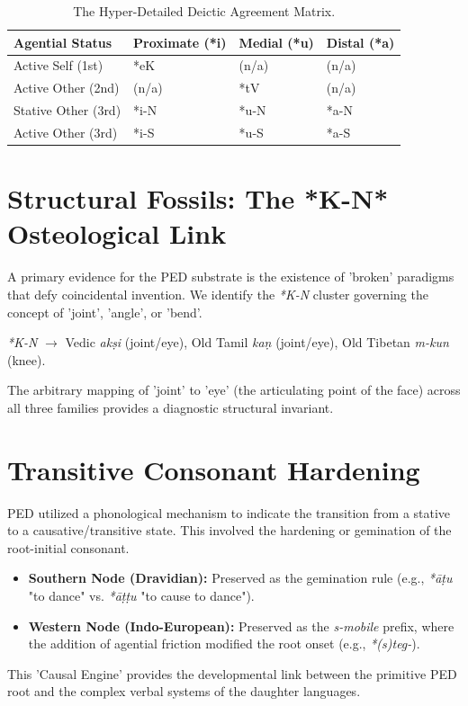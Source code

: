 \documentclass[11pt,oneside,openany]{book}
\begin{document}
\begin{table}[h]
\centering
\begin{tabular}{@{}llll@{}}
\toprule
\textbf{Agential Status} & \textbf{Proximate (*i)} & \textbf{Medial (*u)} & \textbf{Distal (*a)} \\ \midrule
Active Self (1st) & *eK & (n/a) & (n/a) \\
Active Other (2nd) & (n/a) & *tV & (n/a) \\
Stative Other (3rd) & *i-N & *u-N & *a-N \\
Active Other (3rd) & *i-S & *u-S & *a-S \\ \bottomrule
\end{tabular}
\caption{The Hyper-Detailed Deictic Agreement Matrix.}
\end{table}

\section{Structural Fossils: The *K-N* Osteological Link}
A primary evidence for the PED substrate is the existence of 'broken' paradigms that defy coincidental invention. We identify the \textit{*K-N} cluster governing the concept of 'joint', 'angle', or 'bend'.
\begin{center}
\textit{*K-N} $\rightarrow$ Vedic \textit{akṣi} (joint/eye), Old Tamil \textit{kaṇ} (joint/eye), Old Tibetan \textit{m-kun} (knee).
\end{center}
The arbitrary mapping of 'joint' to 'eye' (the articulating point of the face) across all three families provides a diagnostic structural invariant.

\section{Transitive Consonant Hardening}
PED utilized a phonological mechanism to indicate the transition from a stative to a causative/transitive state. This involved the hardening or gemination of the root-initial consonant.
\begin{itemize}
    \item \textbf{Southern Node (Dravidian):} Preserved as the gemination rule (e.g., \textit{*āṭu} "to dance" vs. \textit{*āṭṭu} "to cause to dance").
    \item \textbf{Western Node (Indo-European):} Preserved as the \textit{s-mobile} prefix, where the addition of agential friction modified the root onset (e.g., \textit{*(s)teg-}).
\end{itemize}
This 'Causal Engine' provides the developmental link between the primitive PED root and the complex verbal systems of the daughter languages.
\end{document}
